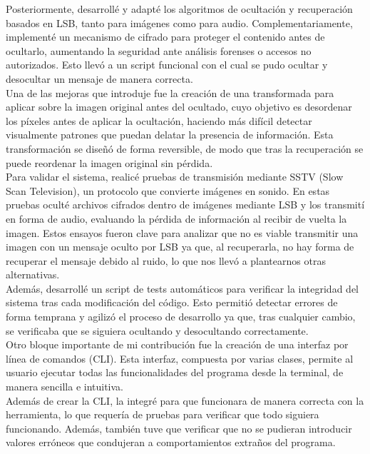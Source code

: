 Posteriormente, desarrollé y adapté los algoritmos de ocultación y recuperación basados en LSB, tanto para imágenes como para audio. Complementariamente, implementé un mecanismo de cifrado para proteger el contenido antes de ocultarlo, aumentando la seguridad ante análisis forenses o accesos no autorizados. Esto llevó a un script funcional con el cual se pudo ocultar y desocultar un mensaje de manera correcta.\\

Una de las mejoras que introduje fue la creación de una transformada para aplicar sobre la imagen original antes del ocultado, cuyo objetivo es desordenar los píxeles antes de aplicar la ocultación, haciendo más difícil detectar visualmente patrones que puedan delatar la presencia de información. Esta transformación se diseñó de forma reversible, de modo que tras la recuperación se puede reordenar la imagen original sin pérdida.\\

Para validar el sistema, realicé pruebas de transmisión mediante SSTV (Slow Scan Television), un protocolo que convierte imágenes en sonido. En estas pruebas oculté archivos cifrados dentro de imágenes mediante LSB y los transmití en forma de audio, evaluando la pérdida de información al recibir de vuelta la imagen. Estos ensayos fueron clave para analizar que no es viable transmitir una imagen con un mensaje oculto por LSB ya que, al recuperarla, no hay forma de recuperar el mensaje debido al ruido, lo que nos llevó a plantearnos otras alternativas.\\

Además, desarrollé un script de tests automáticos para verificar la integridad del sistema tras cada modificación del código. Esto permitió detectar errores de forma temprana y agilizó el proceso de desarrollo ya que, tras cualquier cambio, se verificaba que se siguiera ocultando y desocultando correctamente.\\

Otro bloque importante de mi contribución fue la creación de una interfaz por línea de comandos (CLI). Esta interfaz, compuesta por varias clases, permite al usuario ejecutar todas las funcionalidades del programa desde la terminal, de manera sencilla e intuitiva.\\

Además de crear la CLI, la integré para que funcionara de manera correcta con la herramienta, lo que requería de pruebas para verificar que todo siguiera funcionando. Además, también tuve que verificar que no se pudieran introducir valores erróneos que condujeran a comportamientos extraños del programa.\\

